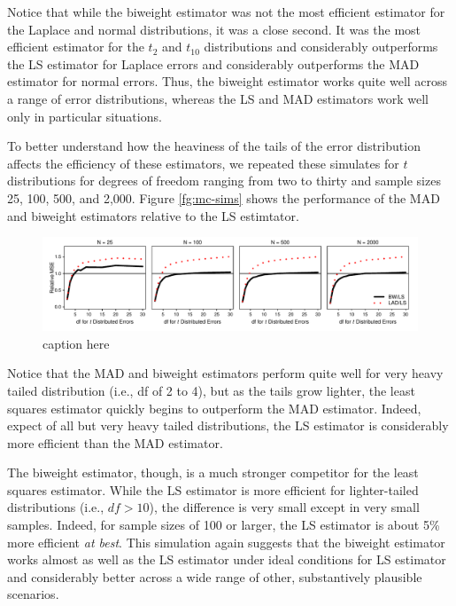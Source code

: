 \documentclass[10pt]{article}
\begin{document}
Notice that while the biweight estimator was not the most efficient estimator for the Laplace and normal distributions, it was a close second. It was the most efficient estimator for the $t_2$ and $t_10$ distributions and considerably outperforms the LS estimator for Laplace errors and considerably outperforms the MAD estimator for normal errors. Thus, the biweight estimator works quite well across a range of error distributions, whereas the LS and MAD estimators work well only in particular situations.

To better understand how the heaviness of the tails of the error distribution affects the efficiency of these estimators, we repeated these simulates for $t$ distributions for degrees of freedom ranging from two to thirty and sample sizes 25, 100, 500, and 2,000. Figure \ref{fg:mc-sims} shows the performance of the MAD and biweight estimators relative to the LS estimtator.

\begin{figure}[h!]
\begin{center}
\includegraphics[width = \textwidth]{figs/mc-sims.pdf}
\caption{caption here}\label{fig:mc-sims}
\end{center}
\end{figure}

Notice that the MAD and biweight estimators perform quite well for very heavy tailed distribution (i.e., df of 2 to 4), but as the tails grow lighter, the least squares estimator quickly begins to outperform the MAD estimator. Indeed, expect of all but very heavy tailed distributions, the LS estimator is considerably more efficient than the MAD estimator. 

The biweight estimator, though, is a much stronger competitor for the least squares estimator. While the LS estimator is more efficient for lighter-tailed distributions (i.e., $df > 10$), the difference is very small except in very small samples. Indeed, for sample sizes of 100 or larger, the LS estimator is about 5\% more efficient \textit{at best}. This simulation again suggests that the biweight estimator works almost as well as the LS estimator under ideal conditions for LS estimator and considerably better across a wide range of other, substantively plausible scenarios.
\end{document}
